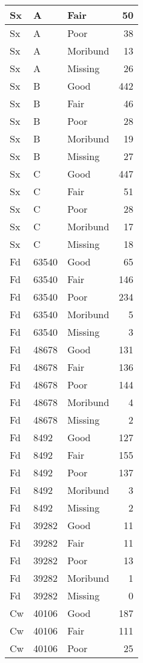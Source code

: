 \documentclass[
]{article}
\begin{document}
\begin{tabular}{l|l|l|r}
\hline
Sx & A & Fair & 50\\
\hline
Sx & A & Poor & 38\\
\hline
Sx & A & Moribund & 13\\
\hline
Sx & A & Missing & 26\\
\hline
Sx & B & Good & 442\\
\hline
Sx & B & Fair & 46\\
\hline
Sx & B & Poor & 28\\
\hline
Sx & B & Moribund & 19\\
\hline
Sx & B & Missing & 27\\
\hline
Sx & C & Good & 447\\
\hline
Sx & C & Fair & 51\\
\hline
Sx & C & Poor & 28\\
\hline
Sx & C & Moribund & 17\\
\hline
Sx & C & Missing & 18\\
\hline
Fd & 63540 & Good & 65\\
\hline
Fd & 63540 & Fair & 146\\
\hline
Fd & 63540 & Poor & 234\\
\hline
Fd & 63540 & Moribund & 5\\
\hline
Fd & 63540 & Missing & 3\\
\hline
Fd & 48678 & Good & 131\\
\hline
Fd & 48678 & Fair & 136\\
\hline
Fd & 48678 & Poor & 144\\
\hline
Fd & 48678 & Moribund & 4\\
\hline
Fd & 48678 & Missing & 2\\
\hline
Fd & 8492 & Good & 127\\
\hline
Fd & 8492 & Fair & 155\\
\hline
Fd & 8492 & Poor & 137\\
\hline
Fd & 8492 & Moribund & 3\\
\hline
Fd & 8492 & Missing & 2\\
\hline
Fd & 39282 & Good & 11\\
\hline
Fd & 39282 & Fair & 11\\
\hline
Fd & 39282 & Poor & 13\\
\hline
Fd & 39282 & Moribund & 1\\
\hline
Fd & 39282 & Missing & 0\\
\hline
Cw & 40106 & Good & 187\\
\hline
Cw & 40106 & Fair & 111\\
\hline
Cw & 40106 & Poor & 25\\

\end{tabular}
\end{document}

